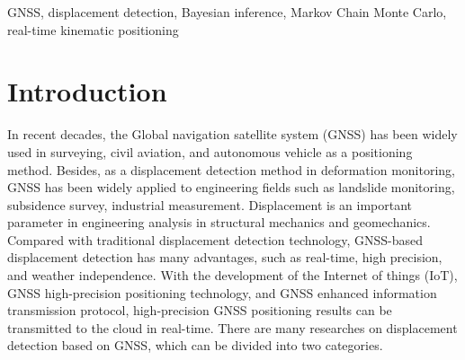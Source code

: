 \documentclass[final,3p,times]{elsarticle}
\begin{document}
\begin{frontmatter}
		
		
		\begin{keyword}
		GNSS, displacement detection, Bayesian inference, Markov Chain Monte Carlo, real-time kinematic positioning
		\end{keyword}
		
	\end{frontmatter}
	
	
	\section{Introduction}
	
	\label{intro}
	In recent decades, the Global navigation satellite system (GNSS) has been widely used in surveying, civil aviation, and autonomous vehicle as a positioning method\cite{barry2011surveying,iatsouk2004development}. 
	Besides, as a displacement detection method in deformation monitoring, GNSS has been widely applied to engineering fields such as landslide monitoring\cite{awange2012environmental}, subsidence survey\cite{bian2014monitoring}, industrial measurement\cite{pavasovic2011application}. 
	Displacement is an important parameter in engineering analysis in structural mechanics and geomechanics\cite{TASORA2020112635,BIGONI2020113315}.
	Compared with traditional displacement detection technology, GNSS-based displacement detection has many advantages, such as real-time, high precision, and weather independence\cite{shen2019a}. 
	With the development of the Internet of things (IoT), GNSS high-precision positioning technology, and GNSS enhanced information transmission protocol, high-precision GNSS positioning results can be transmitted to the cloud in real-time.
	There are many researches on displacement detection based on GNSS, which can be divided into two categories.
	
\end{document}
